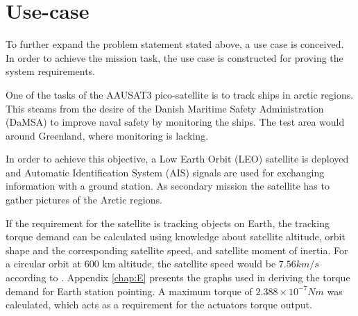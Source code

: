 \section{Use-case}\label{sec:useCase}
To further expand the problem statement stated above, a use case is conceived. In order to achieve the mission task, the use case is constructed for proving the system requirements.

One of the tasks of the AAUSAT3 pico-satellite is to track ships in arctic regions. This steams from the desire of the Danish Maritime Safety Administration (DaMSA) to improve naval safety by monitoring the ships. The test area would around Greenland, where monitoring is lacking. %

In order to achieve this objective, a Low Earth Orbit  (LEO)  satellite is deployed and Automatic Identification System (AIS) signals are used for exchanging information with a ground station. As secondary mission the satellite has to gather pictures of the Arctic regions.

If the requirement for the satellite is tracking objects on Earth, the tracking torque demand can be calculated using knowledge about satellite altitude, orbit shape and the corresponding satellite speed, and satellite moment of inertia. For a circular orbit at 600 km altitude, the satellite speed would be $7.56 km/s$  according to \cite{satSpeed}. Appendix \ref{chap:E} presents the graphs used in deriving the torque demand for Earth station pointing. A maximum torque of ${2.388 \times 10^{-7} Nm}$ was calculated, which acts as a requirement for the actuators torque output.